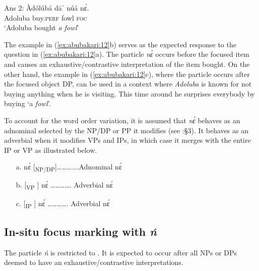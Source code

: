 \documentclass[output=paper,modfonts,nonflat,
 hidelinks
]{langsci/langscibook}
\begin{document}
\ex\label{ex:abubakari:12c} 
Ans 2: \gll Àdólúbá  dāˈ    núá  nɛ́.\\
Adoluba  buy.\textsc{perf}  fowl  \textsc{foc}\\
\glt ‘Adoluba bought \textit{a fowl}’
\z
\z
 
The example in (\ref{ex:abubakari:12}b) serves as the expected response to the question in (\ref{ex:abubakari:12}a). The particle \textit{nɛ́} occurs before the focused item and causes an exhaustive{\slash}contrast\-ive interpretation of the item bought. On the other hand, the example in (\ref{ex:abubakari:12}c), where the particle occurs after the focused object DP, can be used in a context where \textit{Adoluba} is known for not buying anything when he is visiting. This time around he surprises everybody by buying ‘a \textit{fowl}’. 
 

To account for the word order variation, it is assumed that \textit{nɛ́} behaves as an adnominal selected by the NP/DP or PP it modifies (see \citealt{renans2016}:§3). It behaves as an adverbial when it modifies VPs and IPs, in which case it merges with the entire IP or VP as illustrated below. 

 
\begin{itemize}
\item[a.] nɛ́ [\textsubscript{NP/DP}]………....Adnominal nɛ́
\item[b.] [\textsubscript{VP} ] nɛ́ …………. Adverbial nɛ́ 
\item[c.]  [\textsubscript{IP} ] nɛ́ …………. Adverbial nɛ́ 
\end{itemize}

\subsection{In-situ focus marking with \textit{ń}}

The particle \textit{ń} is restricted to  . It is expected to occur after all  NPs or DPs deemed to have an exhaustive{\slash}contrastive  interpretations.
\end{document}
